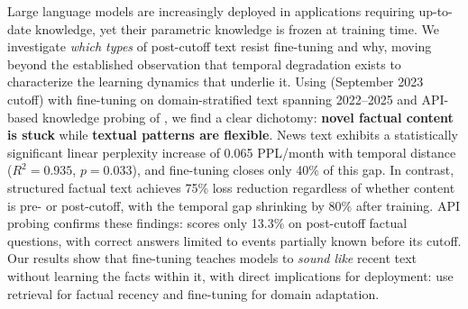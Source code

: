 Large language models are increasingly deployed in applications requiring up-to-date knowledge, yet their parametric knowledge is frozen at training time. We investigate \emph{which types} of post-cutoff text resist fine-tuning and why, moving beyond the established observation that temporal degradation exists to characterize the learning dynamics that underlie it. Using \mistral (September 2023 cutoff) with \lora fine-tuning on domain-stratified text spanning 2022--2025 and API-based knowledge probing of \gptthree, we find a clear dichotomy: \textbf{novel factual content is stuck} while \textbf{textual patterns are flexible}. News text exhibits a statistically significant linear perplexity increase of 0.065 PPL/month with temporal distance ($R^2{=}0.935$, $p{=}0.033$), and fine-tuning closes only 40\% of this gap. In contrast, structured factual text achieves 75\% loss reduction regardless of whether content is pre- or post-cutoff, with the temporal gap shrinking by 80\% after training. API probing confirms these findings: \gptthree scores only 13.3\% on post-cutoff factual questions, with correct answers limited to events partially known before its cutoff. Our results show that fine-tuning teaches models to \emph{sound like} recent text without learning the facts within it, with direct implications for deployment: use retrieval for factual recency and fine-tuning for domain adaptation.
